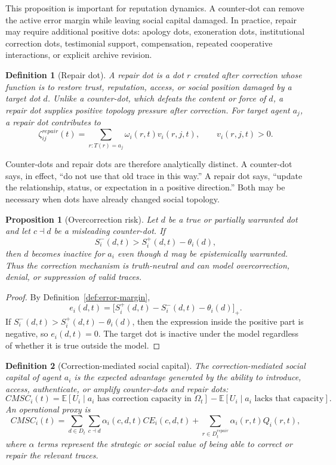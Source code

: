\documentclass[11pt]{article}
\newtheorem{definition}{Definition}
\newtheorem{proposition}{Proposition}
\theoremstyle{remark}
\begin{document}
This proposition is important for reputation dynamics. A counter-dot can
remove the active error margin while leaving social capital damaged. In
practice, repair may require additional positive dots: apology dots,
exoneration dots, institutional correction dots, testimonial support,
compensation, repeated cooperative interactions, or explicit archive
revision.

\begin{definition}[Repair dot]\label{def:repair-dot}
A repair dot is a dot $r$ created after correction whose function is to
restore trust, reputation, access, or social position damaged by a target
dot $d$. Unlike a counter-dot, which defeats the content or force of
$d$, a repair dot supplies positive topology pressure after correction.
For target agent $a_j$, a repair dot contributes to
$$
\zeta_{ij}^{repair}(t)=\sum_{r:T(r)=a_j}\omega_i(r,t)v_i(r,j,t),
\qquad v_i(r,j,t)>0.
$$
\end{definition}

Counter-dots and repair dots are therefore analytically distinct. A
counter-dot says, in effect, ``do not use that old trace in this way.'' A
repair dot says, ``update the relationship, status, or expectation in a
positive direction.'' Both may be necessary when dots have already
changed social topology.

\begin{proposition}[Overcorrection risk]\label{prop:overcorrection-risk}
Let $d$ be a true or partially warranted dot and let $c\dashv d$ be a
misleading counter-dot. If
$$
S_i^-(d,t)>S_i^+(d,t)-\theta_i(d),
$$
then $d$ becomes inactive for $a_i$ even though $d$ may be epistemically
warranted. Thus the correction mechanism is truth-neutral and can model
overcorrection, denial, or suppression of valid traces.
\end{proposition}

\begin{proof}
By Definition~\ref{def:error-margin},
$$
e_i(d,t)=\big[S_i^+(d,t)-S_i^-(d,t)-\theta_i(d)\big]_+.
$$
If $S_i^-(d,t)>S_i^+(d,t)-\theta_i(d)$, then the expression inside the
positive part is negative, so $e_i(d,t)=0$. The target dot is inactive
under the model regardless of whether it is true outside the model.
\end{proof}

\begin{definition}[Correction-mediated social capital]\label{def:correction-mediated-social-capital}
The correction-mediated social capital of agent $a_i$ is the expected
advantage generated by the ability to introduce, access, authenticate, or
amplify counter-dots and repair dots:
$$
CMSC_i(t)=
\mathbb E[U_i\mid \text{$a_i$ has correction capacity in }\Omega_t]
-
\mathbb E[U_i\mid \text{$a_i$ lacks that capacity}].
$$
An operational proxy is
$$
CMSC_i(t)=
\sum_{d\in D_t}\sum_{c\dashv d}
\alpha_i(c,d,t)CE_i(c,d,t)
+
\sum_{r\in D_t^{repair}}\alpha_i(r,t)Q_i(r,t),
$$
where $\alpha$ terms represent the strategic or social value of being
able to correct or repair the relevant traces.
\end{definition}
\end{document}
